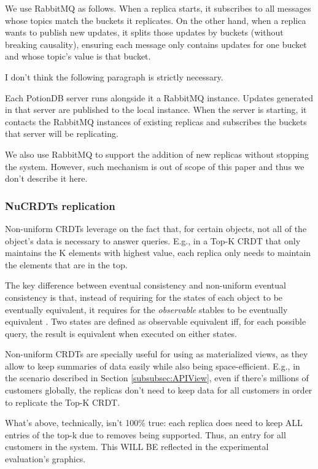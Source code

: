 \documentclass{vldb}
\newcommand{\grumbler}[2]{{\color{red}{\bf #1:} #2}}
\newcommand{\andre}[1]{\grumbler{andre}{#1}}
\begin{document}
We use RabbitMQ as follows.
When a replica starts, it subscribes to all messages whose topics match the buckets it replicates.
On the other hand, when a replica wants to publish new updates, it splits those updates by buckets (without breaking causality), ensuring each message only contains updates for one bucket and whose topic's value is that bucket.

\andre{I don't think the following paragraph is strictly necessary.}

Each PotionDB server runs alongside it a RabbitMQ instance.
Updates generated in that server are published to the local instance.
When the server is starting, it contacts the RabbitMQ instances of existing replicas and subscribes the buckets that server will be replicating.

We also use RabbitMQ to support the addition of new replicas without stopping the system.
However, such mechanism is out of scope of this paper and thus we don't describe it here.

\subsubsection{NuCRDTs replication}

Non-uniform CRDTs \cite{???} leverage on the fact that, for certain objects, not all of the object's data is necessary to answer queries.
E.g., in a Top-K CRDT that only maintains the K elements with highest value, each replica only needs to maintain the elements that are in the top.

The key difference between eventual consistency and non-uniform eventual consistency is that, instead of requiring for the states of each object to be eventually equivalent, it requires for the \emph{observable} stables to be eventually equivalent \cite{???}.
Two states are defined as observable equivalent iff, for each possible query, the result is equivalent when executed on either states.

Non-uniform CRDTs are specially useful for using as materialized views, as they allow to keep summaries of data easily while also being space-efficient.
E.g., in the scenario described in Section \ref{subsubsec:APIView}, even if there's millions of customers globally, the replicas don't need to keep data for all customers in order to replicate the Top-K CRDT.

\andre{What's above, technically, isn't 100\% true: each replica does need to keep ALL entries of the top-k due to removes being supported. Thus, an entry for all customers in the system. This WILL BE reflected in the experimental evaluation's graphics.}

\null\newpage\null

\null\newpage\null
\end{document}
